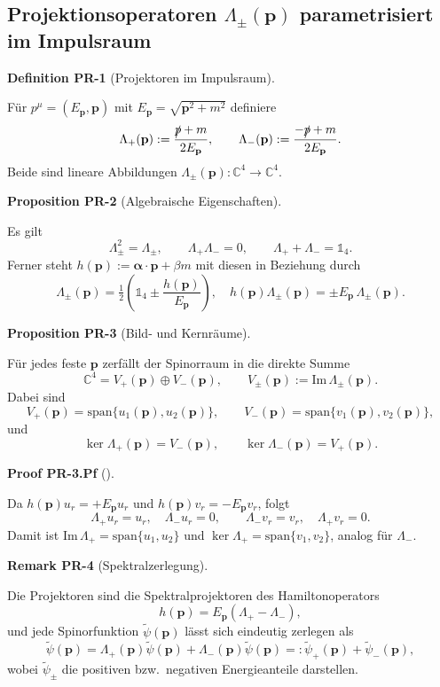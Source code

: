 \documentclass[10pt, letterpaper]{article}
\newcommand{\C}{\mathbb{C}}
\newcommand{\CustomHeading}[3]{%
  \par\medskip\noindent%
  \textbf{#1 #2} \textnormal{(#3)}.\enskip%
}
\newenvironment{DEF}[2]{\begin{unitbox}\CustomHeading{Definition}{#1}{#2}}{\end{unitbox}}
\newenvironment{PROP}[2]{\begin{unitbox}\CustomHeading{Proposition}{#1}{#2}}{\end{unitbox}}
\newenvironment{REM}[2]{\begin{unitbox}\CustomHeading{Remark}{#1}{#2}}{\end{unitbox}}
\newenvironment{PROOF}[2]{\begin{unitbox}\CustomHeading{Proof}{#1}{#2}}{\end{unitbox}}
\begin{document}
\subsection{Projektionsoperatoren $\Lambda_\pm(\mathbf p)$ parametrisiert im Impulsraum}


\begin{DEF}{PR-1}{Projektoren im Impulsraum}
Für $p^\mu=(E_{\mathbf p},\mathbf p)$ mit $E_{\mathbf p}=\sqrt{\mathbf p^2+m^2}$ definiere
\[
\Lambda_+(\mathbf p):=\frac{\slashed p + m}{2E_{\mathbf p}},\qquad
\Lambda_-(\mathbf p):=\frac{-\slashed p + m}{2E_{\mathbf p}}.
\]
Beide sind lineare Abbildungen $\Lambda_\pm(\mathbf p):\C^4\to\C^4$.
\end{DEF}

\begin{PROP}{PR-2}{Algebraische Eigenschaften}
Es gilt
\[
\Lambda_\pm^2=\Lambda_\pm,\qquad
\Lambda_+\Lambda_-=0,\qquad
\Lambda_++\Lambda_-=\mathbb{1}_4.
\]
Ferner steht $h(\mathbf p):=\boldsymbol{\alpha}\!\cdot\!\mathbf p+\beta m$ mit diesen in Beziehung durch
\[
\Lambda_\pm(\mathbf p)=\tfrac{1}{2}\!\left(\mathbb{1}_4\pm\frac{h(\mathbf p)}{E_{\mathbf p}}\right),
\quad
h(\mathbf p)\Lambda_\pm(\mathbf p)=\pm E_{\mathbf p}\,\Lambda_\pm(\mathbf p).
\]
\end{PROP}

\begin{PROP}{PR-3}{Bild- und Kernräume}
Für jedes feste $\mathbf p$ zerfällt der Spinorraum in die direkte Summe
\[
\C^4=V_+(\mathbf p)\oplus V_-(\mathbf p),
\qquad
V_\pm(\mathbf p):=\mathrm{Im}\,\Lambda_\pm(\mathbf p).
\]
Dabei sind
\[
V_+(\mathbf p)=\mathrm{span}\{u_1(\mathbf p),u_2(\mathbf p)\},\qquad
V_-(\mathbf p)=\mathrm{span}\{v_1(\mathbf p),v_2(\mathbf p)\},
\]
und
\[
\ker\Lambda_+(\mathbf p)=V_-(\mathbf p),\qquad
\ker\Lambda_-(\mathbf p)=V_+(\mathbf p).
\]
\end{PROP}

\begin{PROOF}{PR-3.Pf}{}
Da $h(\mathbf p)u_r=+E_{\mathbf p}u_r$ und $h(\mathbf p)v_r=-E_{\mathbf p}v_r$, folgt
\[
\Lambda_+u_r=u_r,\quad \Lambda_-u_r=0,\qquad
\Lambda_-v_r=v_r,\quad \Lambda_+v_r=0.
\]
Damit ist $\mathrm{Im}\,\Lambda_+=\mathrm{span}\{u_1,u_2\}$ und $\ker\Lambda_+=\mathrm{span}\{v_1,v_2\}$, analog für $\Lambda_-$.
\end{PROOF}

\begin{REM}{PR-4}{Spektralzerlegung}
Die Projektoren sind die Spektralprojektoren des Hamiltonoperators
\[
h(\mathbf p)=E_{\mathbf p}(\Lambda_+ - \Lambda_-),
\]
und jede Spinorfunktion $\tilde\psi(\mathbf p)$ lässt sich eindeutig zerlegen als
\[
\tilde\psi(\mathbf p)=\Lambda_+(\mathbf p)\tilde\psi(\mathbf p)
+\Lambda_-(\mathbf p)\tilde\psi(\mathbf p)
=:\tilde\psi_+(\mathbf p)+\tilde\psi_-(\mathbf p),
\]
wobei $\tilde\psi_\pm$ die positiven bzw.\ negativen Energieanteile darstellen.
\end{REM}
\end{document}

